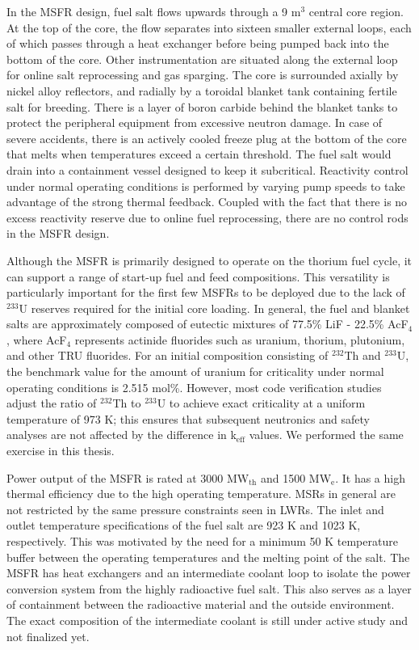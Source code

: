 In the \gls{MSFR} design, fuel salt flows upwards through a 9 m$^3$ central
core region. At the top of the core, the flow separates into sixteen smaller
external loops, each of which passes through a heat exchanger before being
pumped back into the bottom of the core. Other instrumentation are situated
along the external loop for online salt reprocessing and gas sparging. The
core is surrounded axially by nickel alloy reflectors, and radially by a
toroidal blanket tank containing fertile salt for breeding. There is a layer
of boron carbide behind the blanket tanks to protect the peripheral equipment
from excessive neutron damage. In case of severe accidents, there is an
actively cooled freeze plug at the bottom of the core that melts when
temperatures exceed a certain threshold. The fuel salt would drain into a
containment vessel designed to keep it subcritical. Reactivity control under
normal operating conditions is performed by varying pump speeds to take
advantage of the strong thermal feedback. Coupled with the fact that there is
no excess reactivity reserve due to online fuel reprocessing, there are no
control rods in the \gls{MSFR} design.

Although the \gls{MSFR} is primarily designed to operate on the thorium fuel
cycle, it can support a range of start-up fuel and feed compositions. This
versatility is particularly important for the first few \glspl{MSFR} to be
deployed due to the lack of $^{233}$U reserves required for the initial core
loading. In general, the fuel and blanket salts are approximately composed of
eutectic mixtures of 77.5\% LiF - 22.5\% AcF$_4$, where AcF$_4$ represents
actinide fluorides such as uranium, thorium, plutonium, and other \gls{TRU}
fluorides. For an initial composition consisting of $^{232}$Th and $^{233}$U,
the benchmark value for the amount of uranium for criticality under
normal operating conditions is 2.515 mol\%. However, most code verification
studies adjust the ratio of $^{232}$Th to $^{233}$U to achieve exact
criticality at a uniform temperature of 973 K; this ensures that subsequent
neutronics and safety analyses are not affected by the difference in
k$_{\text{eff}}$ values. We performed the same exercise in this thesis.

Power output of the \gls{MSFR} is rated at 3000 MW$_{\text{th}}$ and 1500
MW$_{\text{e}}$. It has a high thermal efficiency due to the high operating
temperature. \glspl{MSR} in general are not restricted by the same pressure
constraints seen in \glspl{LWR}. The inlet and outlet temperature
specifications of the fuel salt are 923 K and 1023 K, respectively. This was
motivated by the need for a minimum 50 K temperature buffer between the
operating temperatures and the melting point of the salt. The \gls{MSFR} has
heat exchangers and an intermediate coolant loop to isolate the power
conversion system from the highly radioactive fuel salt. This also serves as
a layer of containment between the radioactive material and the outside
environment. The exact composition of the intermediate coolant is still under
active study and not finalized yet.

